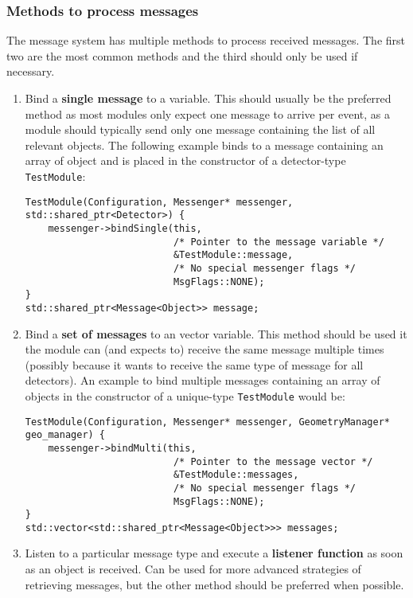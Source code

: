 \subsubsection{Methods to process messages}
The message system has multiple methods to process received messages.
The first two are the most common methods and the third should only be used if necessary.
\begin{enumerate}
\item Bind a \textbf{single message} to a variable.
This should usually be the preferred method as most modules only expect one message to arrive per event, as a module should typically send only one message containing the list of all relevant objects.
The following example binds to a message containing an array of object and is placed in the constructor of a detector-type \texttt{TestModule}:
\begin{verbatim}
TestModule(Configuration, Messenger* messenger, std::shared_ptr<Detector>) {
    messenger->bindSingle(this,
                          /* Pointer to the message variable */
                          &TestModule::message,
                          /* No special messenger flags */
                          MsgFlags::NONE);
}
std::shared_ptr<Message<Object>> message;
\end{verbatim}
\item Bind a \textbf{set of messages} to an vector variable.
This method should be used it the module can (and expects to) receive the same message multiple times (possibly because it wants to receive the same type of message for all detectors).
An example to bind multiple messages containing an array of objects in the constructor of a unique-type \texttt{TestModule} would be:
\begin{verbatim}
TestModule(Configuration, Messenger* messenger, GeometryManager* geo_manager) {
    messenger->bindMulti(this,
                          /* Pointer to the message vector */
                          &TestModule::messages,
                          /* No special messenger flags */
                          MsgFlags::NONE);
}
std::vector<std::shared_ptr<Message<Object>>> messages;
\end{verbatim}
\item Listen to a particular message type and execute a \textbf{listener function} as soon as an object is received.
Can be used for more advanced strategies of retrieving messages, but the other method should be preferred when possible.

\end{enumerate}
